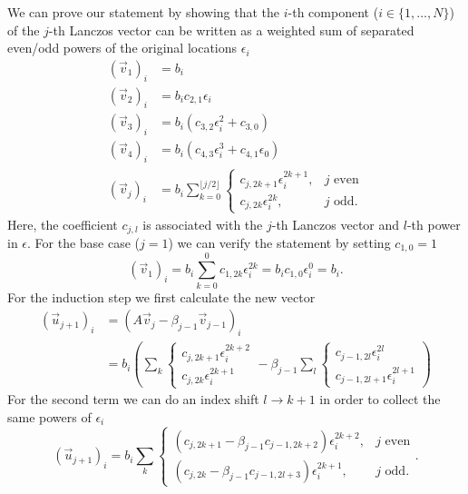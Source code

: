 We can prove our statement by showing that the $i$-th component ($i \in \{1, \ldots, N\}$)
of the $j$-th Lanczos vector
can be written as a weighted sum
of separated even/odd powers of the original locations $\epsilon_i$
\begin{align}
    (\vec{v}_1)_i
     & = b_i                                            \\
    (\vec{v}_2)_i
     & = b_i c_{2,1} \epsilon_i                         \\
    (\vec{v}_3)_i
     & = b_i ( c_{3,2}\epsilon_i^2 + c_{3,0})           \\
    (\vec{v}_4)_i
     & = b_i ( c_{4,3}\epsilon_i^3 + c_{4,1}\epsilon_0) \\
    (\vec{v}_j)_i
     & =
    b_i\sum\limits_{k=0}^{\lfloor j/2\rfloor}
    \begin{cases}
        c_{j,2k+1} \epsilon_i^{2k+1}, & j \text{ even} \\
        c_{j,2k} \epsilon_i^{2k},     & j \text{ odd}.
    \end{cases}
    \label{eq:statement-tridiagonalization}
\end{align}
Here, the coefficient $c_{j,l}$ is associated with the $j$-th Lanczos vector
and $l$-th power in $\epsilon$.
For the base case ($j=1$) we can verify the statement by setting $c_{1,0}=1$
\begin{equation}
    (\vec{v}_1)_i
    =
    b_i\!\sum\limits_{k=0}^{0} c_{1,2k} \epsilon_i^{2k}
    =
    b_i c_{1,0} \epsilon_i^0
    =
    b_i.
\end{equation}
For the induction step we first calculate the new vector
\begin{align}
    (\vec{u}_{j+1})_i
     & =
    (A \vec{v}_j - \beta_{j-1}\vec{v}_{j-1})_i \\
     & =
    b_i
    \left(
    \sum\limits_k
    \begin{cases}
        c_{j,2k+1} \epsilon_i^{2k+2} \\
        c_{j,2k} \epsilon_i^{2k+1}
    \end{cases}
    - \beta_{j-1}
    \sum\limits_l
    \begin{cases}
        c_{j-1,2l} \epsilon_i^{2l} \\
        c_{j-1,2l+1} \epsilon_i^{2l+1}
    \end{cases}
    \right)
\end{align}
For the second term we can do an index shift $l \rightarrow k+1$
in order to collect the same powers of $\epsilon_i$
\begin{equation}
    (\vec{u}_{j+1})_i
    =
    b_i
    \sum\limits_k
    \begin{cases}
        (c_{j,2k+1} - \beta_{j-1} c_{j-1,2k+2}) \epsilon_i^{2k+2}, & j \text{ even} \\
        (c_{j,2k} - \beta_{j-1} c_{j-1,2l+3}) \epsilon_i^{2k+1},   & j \text{ odd}.
    \end{cases}.
\end{equation}
